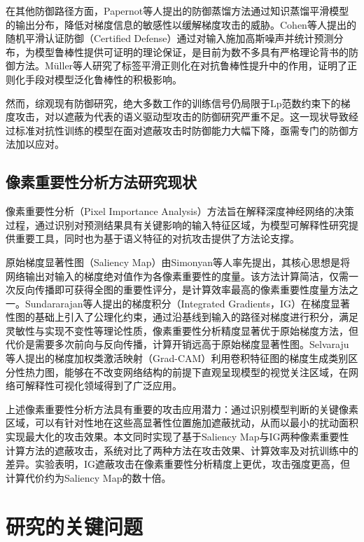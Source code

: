 在其他防御路径方面，Papernot等人提出的防御蒸馏方法\cite{papernot2016distillation}通过知识蒸馏平滑模型的输出分布，降低对梯度信息的敏感性以缓解梯度攻击的威胁。Cohen等人提出的随机平滑认证防御（Certified Defense）\cite{cohen2019certified}通过对输入施加高斯噪声并统计预测分布，为模型鲁棒性提供可证明的理论保证，是目前为数不多具有严格理论背书的防御方法。M\"{u}ller等人研究了标签平滑正则化在对抗鲁棒性提升中的作用\cite{muller2019labelsmoothing}，证明了正则化手段对模型泛化鲁棒性的积极影响。

然而，综观现有防御研究，绝大多数工作的训练信号仍局限于Lp范数约束下的梯度攻击，对以遮蔽为代表的语义驱动型攻击的防御研究严重不足。这一现状导致经过标准对抗性训练的模型在面对遮蔽攻击时防御能力大幅下降，亟需专门的防御方法加以应对。

\subsection{像素重要性分析方法研究现状}

像素重要性分析（Pixel Importance Analysis）方法旨在解释深度神经网络的决策过程，通过识别对预测结果具有关键影响的输入特征区域，为模型可解释性研究提供重要工具，同时也为基于语义特征的对抗攻击提供了方法论支撑。

原始梯度显著性图（Saliency Map）由Simonyan等人率先提出\cite{simonyan2014saliency}，其核心思想是将网络输出对输入的梯度绝对值作为各像素重要性的度量。该方法计算简洁，仅需一次反向传播即可获得全图的重要性评分，是计算效率最高的像素重要性度量方法之一。Sundararajan等人提出的梯度积分（Integrated Gradients，IG）\cite{sundararajan2017ig}在梯度显著性图的基础上引入了公理化约束，通过沿基线到输入的路径对梯度进行积分，满足灵敏性与实现不变性等理论性质，像素重要性分析精度显著优于原始梯度方法，但代价是需要多次前向与反向传播，计算开销远高于原始梯度显著性图。Selvaraju等人提出的梯度加权类激活映射（Grad-CAM）\cite{selvaraju2017gradcam}利用卷积特征图的梯度生成类别区分性热力图，能够在不改变网络结构的前提下直观呈现模型的视觉关注区域，在网络可解释性可视化领域得到了广泛应用。

上述像素重要性分析方法具有重要的攻击应用潜力：通过识别模型判断的关键像素区域，可以有针对性地在这些高显著性位置施加遮蔽扰动，从而以最小的扰动面积实现最大化的攻击效果。本文同时实现了基于Saliency Map与IG两种像素重要性计算方法的遮蔽攻击，系统对比了两种方法在攻击效果、计算效率及对抗训练中的差异。实验表明，IG遮蔽攻击在像素重要性分析精度上更优，攻击强度更高，但计算代价约为Saliency Map的数十倍。


\section{研究的关键问题}

